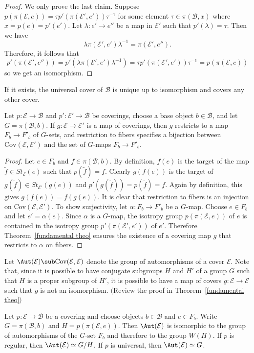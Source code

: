 \begin{proof}
We only prove the last claim. Suppose $p(\pi(\mathcal{E},e))=\tau p'(\pi(\mathcal{E}',e'))\tau^{-1}$ for some element $\tau\in\pi(\mathcal{B},x)$ where $x=p(e)=p'(e')$. Let $\lambda:e'\to e''$ be a map in $\mathcal{E}'$ such that $p'(\lambda)=\tau$. Then we have 
\[\lambda\pi(\mathcal{E}',e')\lambda^{-1}=\pi(\mathcal{E}',e'').\]
Therefore, it follows that
\[p'(\pi(\mathcal{E}',e''))=p'(\lambda\pi(\mathcal{E}',e')\lambda^{-1})=\tau p'(\pi(\mathcal{E}',e'))\tau^{-1}=p(\pi(\mathcal{E},e))\]
so we get an isomorphism.
\end{proof}
\begin{corollary}
If it exists, the universal cover of $\mathcal{B}$ is unique up to isomorphism
and covers any other cover.
\end{corollary}
\begin{theorem}\label{rest to fiber}
Let $p:\mathcal{E}\to\mathcal{B}$ and $p':\mathcal{E}'\to\mathcal{B}$ be coverings, choose a base object $b\in\mathcal{B}$, and let $G=\pi(\mathcal{B},b)$. If $g:\mathcal{E}\to\mathcal{E}'$ is a map of coverings, then $g$ restricts to a map $F_b\to F'_b$ of $G$-sets, and restriction to fibers specifies a bijection between $\mathrm{Cov}(\mathcal{E},\mathcal{E}')$ and the set of $G$-maps $F_b\to F'_b$.
\end{theorem}
\begin{proof}
Let $e\in F_b$ and $f\in\pi(\mathcal{B},b)$. By definition, $f(e)$ is the target of the map $\widetilde{f}\in St_{\mathcal{E}}(e)$ such that $p(\widetilde{f})=f$. Clearly $g(f(e))$ is the target of $g(\widetilde{f})\in St_{\mathcal{E}'}(g(e))$ and $p'(g(\widetilde{f}))=p(\widetilde{f})=f$. Again by definition, this gives $g(f(e))=f(g(e))$. It is clear that restriction to fibers is an injection on $\mathrm{Cov}(\mathcal{E},\mathcal{E}')$. To show surjectivity, let $\alpha:F_b\to F'_b$ be a $G$-map. Choose $e\in F_b$ and let $e'=\alpha(e)$. Since $\alpha$ is a $G$-map, the isotropy group $p(\pi(\mathcal{E},e))$ of $e$ is contained in the isotropy group $p'(\pi(\mathcal{E}',e'))$ of $e'$. Therefore Theorem~\ref{fundamental theo} ensures the existence of a covering map $g$ that restricts to $\alpha$ on fibers.
\end{proof}
\begin{definition}
Let $\Aut(\mathcal{E})\sub\mathrm{Cov}(\mathcal{E},\mathcal{E})$ denote the group of automorphisms of a cover $\mathcal{E}$. Note that, since it is possible to have conjugate subgroups $H$ and $H'$ of a group $G$ such that $H$ is a proper subgroup of $H'$, it is possible to have a map of covers $g:\mathcal{E}\to\mathcal{E}$ such that $g$ is not an isomorphism. $($Review the proof in Theorem~\ref{fundamental theo}$)$
\end{definition}
\begin{corollary}
Let $p:\mathcal{E}\to\mathcal{B}$ be a covering and choose objects $b\in\mathcal{B}$ and $e\in F_b$. Write $G=\pi(\mathcal{B},b)$ and $H=p(\pi(\mathcal{E},e))$. Then $\Aut(\mathcal{E})$ is isomorphic to the group of automorphisms of the $G$-set $F_b$ and therefore to the group $W(H)$. If $p$
is regular, then $\Aut(\mathcal{E})\simeq G/H$. If $p$ is universal, then $\Aut(\mathcal{E})\simeq G$.
\end{corollary}
